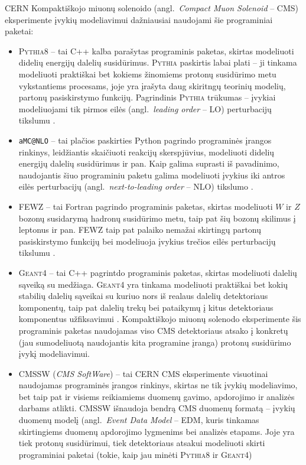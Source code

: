 \documentclass[a4paper, 12pt]{article}
\newcommand{\ttt}[1]{\texttt{#1}}
\begin{document}
CERN Kompaktiškojo miuonų solenoido (angl.\ \textit{Compact Muon Solenoid} -- CMS) eksperimente
įvykių modeliavimui dažniausiai naudojami šie programiniai paketai:
\begin{itemize}
	\item \textsc{Pythia8} -- tai C++ kalba parašytas programinis paketas, skirtas modeliuoti
	didelių energijų dalelių susidūrimus.
	\textsc{Pythia} paskirtis labai plati -- ji tinkama modeliuoti praktiškai bet kokiems žinomiems protonų
	susidūrimo metu vykstantiems procesams, joje yra įrašyta daug skiritngų teorinių modelių,
	partonų pasiskirstymo funkcijų.
	Pagrindinis \textsc{Pythia} trūkumas -- įvykiai modeliuojami tik pirmos eilės (angl.\
	\textit{leading order} -- LO) perturbacijų tikslumu \cite{pythia82}.
	
	\item \ttt{aMC@NLO} -- tai plačios paskirties Python pagrindo programinės įrangos rinkinys,
	leidžiantis skaičiuoti reakcijų skerspjūvius, modeliuoti didelių energijų dalelių susidūrimus ir pan.
	Kaip galima suprasti iš pavadinimo, naudojantis šiuo programiniu paketu galima modeliuoti įvykius
	iki antros eilės perturbacijų (angl.\ \textit{next-to-leading order} -- NLO) tikslumo \cite{amcatnlo}.
	
	\item FEWZ -- tai Fortran pagrindo programinis paketas, skirtas modeliuoti  $W$ ir $Z$
	bozonų susidarymą hadronų susidūrimo metu, taip pat šių bozonų skilimus į leptonus ir pan.
	FEWZ taip pat palaiko nemažai skirtingų partonų pasiskirstymo funkcijų bei modeliuoja įvykius
	trečios eilės perturbacijų tikslumu \cite{fewz}.
	
	\item \textsc{Geant4} -- tai C++ pagrintdo programinis paketas, skirtas modeliuoti dalelių sąveiką
	su medžiaga.
	\textsc{Geant4} yra tinkama modeliuoti praktiškai bet kokių stabilių dalelių sąveikai su kuriuo nors iš
	realaus dalelių detektoriaus komponentų, taip pat dalelių trekų bei pataikymų į kitus detektoriaus
	komponentus užfiksavimui \cite{geant4}.
	Kompaktiškojo miuonų solenodo eksperimente šis programinis paketas naudojamas viso CMS detektoriaus
	atsako į konkretų (jau sumodeliuotą naudojantis kita programine įranga) protonų susidūrimo įvykį
	modeliavimui.
	
	\item CMSSW (\textit{CMS SoftWare}) -- tai CERN CMS eksperimente visuotinai naudojamas programinės
	įrangos rinkinys, skirtas ne tik įvykių modeliavimo, bet taip pat ir  visiems reikiamiems duomenų
	gavimo, apdorojimo ir analizės darbams atlikti.
	CMSSW išnaudoja bendrą CMS duomenų formatą -- įvykių duomenų modelį (angl.\ \textit{Event Data Model}
	-- EDM, kuris tinkamas skirtingiems duomenų apdorojimo lygmenims bei analizės etapams.
	Joje yra tiek protonų susidūrimui, tiek detektoriaus atsakui modeliuoti skirti programiniai paketai
	(tokie, kaip jau minėti \textsc{Pythia8} ir \textsc{Geant4})
\end{itemize}
\end{document}
